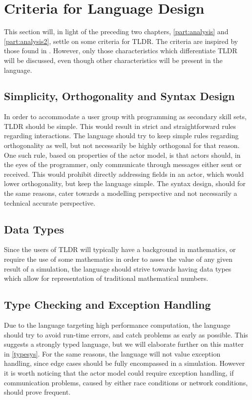 \section{Criteria for Language Design}\label{analsum}

This section will, in light of the preceding two chapters, \cref{part:analysis} and \cref{part:analysis2}, settle on some criteria for TLDR. The criteria are inspired by those found in \cite{sebesta2015concepts}. However, only those characteristics which differentiate TLDR will be discussed, even though other characteristics will be present in the language.


\subsection{Simplicity, Orthogonality and Syntax Design}

In order to accommodate a user group with programming as secondary skill sets, TLDR should be simple. This would result in strict and straightforward rules regarding interactions. The language should try to keep simple rules regarding orthogonality as well, but not necessarily be highly orthogonal for that reason. One such rule, based on properties of the actor model, is that actors should, in the eyes of the programmer, only communicate through messages either sent or received. This would prohibit directly addressing fields in an actor, which would lower orthogonality, but keep the language simple. The syntax design, should for the same reasons, cater towards a modelling perspective and not necessarily a technical accurate perspective.

\subsection{Data Types}

Since the users of TLDR will typically have a background in mathematics, or require  the use of some mathematics in order to asses the value of any given result of a simulation, the language should strive towards having data types which allow for representation of traditional mathematical numbers.


\subsection{Type Checking and Exception Handling}

Due to the language targeting high performance computation, the language should try to avoid run-time errors, and catch problems as early as possible. This suggests a strongly typed language, but we will elaborate further on this matter in \cref{typesys}. For the same reasons, the language will not value exception handling, since edge cases should be fully encompassed in a simulation. However it is worth noticing that the actor model could require exception handling, if communication problems, caused by either race conditions or network conditions, should prove frequent.

